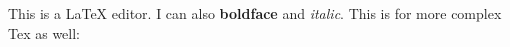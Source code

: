 This is a LaTeX editor. I can also \textbf{boldface} and \textit{italic}. This is for more complex Tex as well:

